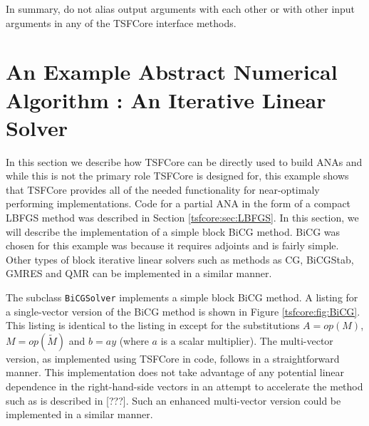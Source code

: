 In summary, do not alias output arguments with each other or with
other input arguments in any of the TSFCore interface methods.

%
\section{An Example Abstract Numerical Algorithm : An Iterative Linear Solver}
\label{tsfcore:sec:ANA_iter_solver_example}
%

In this section we describe how TSFCore can be directly used to build
ANAs and while this is not the primary role TSFCore is designed for, this
example shows that TSFCore provides all of the needed functionality for
near-optimaly performing implementations.  Code for a partial ANA in
the form of a compact LBFGS method was described in Section
\ref{tsfcore:sec:LBFGS}.  In this section, we will describe the
implementation of a simple block BiCG
\cite{ref:tmpls_for_iter_systems} method.  BiCG was chosen for this
example was because it requires adjoints and is fairly simple.  Other
types of block iterative linear solvers such as methods as CG,
BiCGStab, GMRES and QMR \cite{ref:tmpls_for_iter_systems} can be
implemented in a similar manner.

The subclass \texttt{BiCG\-Solver} implements a simple block BiCG
method.  A listing for a single-vector version of the BiCG method is
shown in Figure \ref{tsfcore:fig:BiCG}.  This listing is identical to
the listing in \cite{ref:tmpls_for_iter_systems} except for the
substitutions $A = op(M)$, $M = op(\tilde{M})$ and $b =a y$ (where $a$
is a scalar multiplier).  The multi-vector version, as implemented
using TSFCore in code, follows in a straightforward manner.  This
implementation does not take advantage of any potential linear
dependence in the right-hand-side vectors in an attempt to accelerate
the method such as is described in [???].  Such an enhanced
multi-vector version could be implemented in a similar manner.

